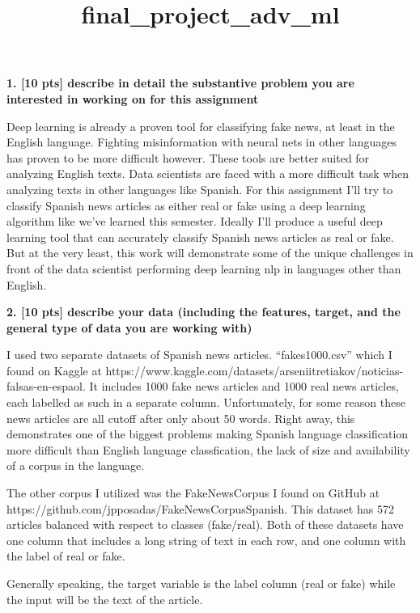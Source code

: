 \documentclass[11pt]{article}
\title{final\_project\_adv\_ml}
\begin{document}
    
    \maketitle
    
    

    
    \textbf{1. {[}10 pts{]} describe in detail the substantive problem you
are interested in working on for this assignment}

    Deep learning is already a proven tool for classifying fake news, at
least in the English language. Fighting misinformation with neural nets
in other languages has proven to be more difficult however. These tools
are better suited for analyzing English texts. Data scientists are faced
with a more difficult task when analyzing texts in other languages like
Spanish. For this assignment I'll try to classify Spanish news articles
as either real or fake using a deep learning algorithm like we've
learned this semester. Ideally I'll produce a useful deep learning tool
that can accurately classify Spanish news articles as real or fake. But
at the very least, this work will demonstrate some of the unique
challenges in front of the data scientist performing deep learning nlp
in languages other than English.

    \textbf{2. {[}10 pts{]} describe your data (including the features,
target, and the general type of data you are working with)}

    I used two separate datasets of Spanish news articles. ``fakes1000.csv''
which I found on Kaggle at
https://www.kaggle.com/datasets/arseniitretiakov/noticias-falsas-en-espaol.
It includes 1000 fake news articles and 1000 real news articles, each
labelled as such in a separate column. Unfortunately, for some reason
these news articles are all cutoff after only about 50 words. Right
away, this demonstrates one of the biggest problems making Spanish
language classification more difficult than English language
classfication, the lack of size and availability of a corpus in the
language.

The other corpus I utilized was the FakeNewsCorpus I found on GitHub at
https://github.com/jpposadas/FakeNewsCorpusSpanish. This dataset has 572
articles balanced with respect to classes (fake/real). Both of these
datasets have one column that includes a long string of text in each
row, and one column with the label of real or fake.

Generally speaking, the target variable is the label column (real or
fake) while the input will be the text of the article.
\end{document}
